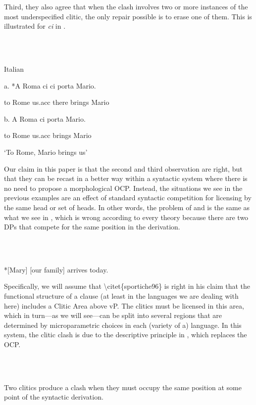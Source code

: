 \documentclass[output=paper,modfonts,nonflat]{langsci/langscibook}
\begin{document}
Third, they also agree that when the clash involves two or more instances of the most underspecified clitic, the only repair possible is to erase one of them. This is illustrated for \textit{ci} in .

\ea%
    \label{ex:key:5}
    \gll\\
        \\
    \glt
    \z

          Italian 

    a. *A Roma  ci  ci   porta   Mario.

              to Rome  us.acc  there  brings  Mario

    b. A Roma   ci  porta   Mario.      

                   to Rome  us.acc  brings  Mario

    ‘To Rome, Mario brings us’

Our claim in this paper is that the second and third observation are right, but that they can be recast in a better way within a syntactic system where there is no need to propose a morphological OCP. Instead, the situations we see in the previous examples are an effect of standard syntactic competition for licensing by the same head or set of heads. In other words, the problem of  and  is the same as what we see in , which is wrong according to every theory because there are two DPs that compete for the same position in the derivation.

\ea%
    \label{ex:key:6}
    \gll\\
        \\
    \glt
    \z

            *[Mary] [our family] arrives today.

Specifically, we will assume that {\textbackslash}citet\{sportiche96\} is right in his claim that the functional structure of a clause (at least in the languages we are dealing with here) includes a Clitic Area above vP. The clitics must be licensed in this area, which in turn—as we will see—can be split into several regions that are determined by microparametric choices in each (variety of a) language. In this system, the clitic clash is due to the descriptive principle in , which replaces the OCP.

\ea%
    \label{ex:key:7}
    \gll\\
        \\
    \glt
    \z

          Two clitics produce a clash when they must occupy the same   position at some point of the syntactic derivation.
\end{document}
